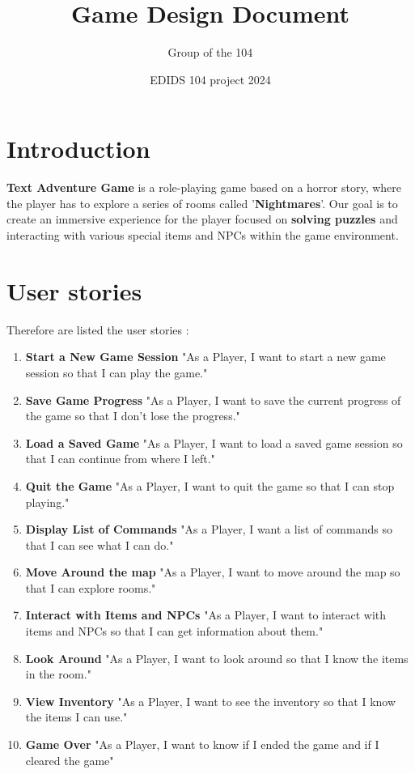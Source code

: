 \documentclass{article}
\title{\textbf{Game Design Document}}
\author{Group of the 104}
\date{EDIDS 104 project 2024}
\begin{document}
\maketitle

\section{Introduction}

\textbf{Text Adventure Game} is a role-playing game based on a horror story, where the player has to explore a series of rooms called '\textbf{Nightmares}'. Our goal is to create an immersive experience for the player focused on \textbf{solving puzzles} and interacting with various special items and NPCs within the game environment.


\section{User stories}

Therefore are listed the user stories :

\begin{enumerate}
    \item \textbf{Start a New Game Session}
"As a Player, I want to start a new game session so that I can play the game."

    \item \textbf{Save Game Progress}
"As a Player, I want to save the current progress of the game so that I don’t lose the progress."

    \item \textbf{Load a Saved Game}
"As a Player, I want to load a saved game session so that I can continue from where I left."

    \item \textbf{Quit the Game}
"As a Player, I want to quit the game so that I can stop playing."

    \item \textbf{Display List of Commands}
"As a Player, I want a list of commands so that I can see what I can do."

    \item \textbf{Move Around the map}
"As a Player, I want to move around the map so that I can explore rooms."

    \item \textbf{Interact with Items and NPCs}
"As a Player, I want to interact with items and NPCs so that I can get information about them."

    \item \textbf{Look Around}
"As a Player, I want to look around so that I know the items in the room."

    \item \textbf{View Inventory}
"As a Player, I want to see the inventory so that I know the items I can use."

\item \textbf{Game Over}
"As a Player, I want to know if I ended the game and if I cleared the game"

\end{enumerate}
\end{document}
